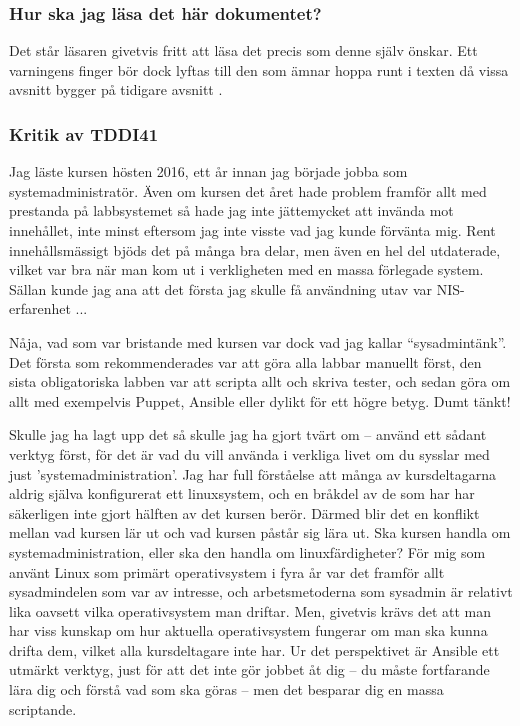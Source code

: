 \subsubsection{Hur ska jag läsa det här dokumentet?}
Det står läsaren givetvis fritt att läsa det precis som denne själv önskar. Ett varningens finger bör dock lyftas till den som ämnar hoppa runt i texten då vissa avsnitt bygger på tidigare avsnitt
.%

\subsubsection{Kritik av TDDI41}
Jag läste kursen hösten 2016, ett år innan jag började jobba som systemadministratör.
Även om kursen det året hade problem framför allt med prestanda på labbsystemet så hade jag inte jättemycket att invända mot innehållet, inte minst eftersom jag inte visste vad jag kunde förvänta mig.
Rent innehållsmässigt bjöds det på många bra delar, men även en hel del utdaterade, vilket var bra när man kom ut i verkligheten med en massa förlegade system. Sällan kunde jag ana att det första jag 
skulle få användning utav var NIS-erfarenhet ...

Nåja, vad som var bristande med kursen var dock vad jag kallar ``sysadmintänk''. Det första som rekommenderades var att göra alla labbar manuellt först, den sista obligatoriska labben var att scripta allt och skriva tester,
och sedan göra om allt med exempelvis Puppet, Ansible eller dylikt för ett högre betyg. Dumt tänkt!

Skulle jag ha lagt upp det så skulle jag ha gjort tvärt om -- använd ett sådant verktyg först, för det är vad du vill använda i verkliga livet om du sysslar med just 'systemadministration'. Jag har full förståelse att många av 
kursdeltagarna aldrig själva konfigurerat ett linuxsystem, och en bråkdel av de som har har säkerligen inte gjort
hälften av det kursen berör. Därmed blir det en konflikt mellan vad kursen lär ut och vad kursen påstår sig lära ut.
Ska kursen handla om systemadministration, eller ska den handla om linuxfärdigheter? För mig som använt Linux som
primärt operativsystem i fyra år var det framför allt sysadmindelen som var av intresse, och arbetsmetoderna som
sysadmin är relativt lika oavsett vilka operativsystem man driftar. Men, givetvis krävs det att man har viss kunskap
om hur aktuella operativsystem fungerar om man ska kunna drifta dem, vilket alla kursdeltagare inte har.
Ur det perspektivet är Ansible ett utmärkt verktyg, just för att det inte gör jobbet åt dig -- du måste fortfarande
lära dig och förstå vad som ska göras -- men det besparar dig en massa scriptande.

